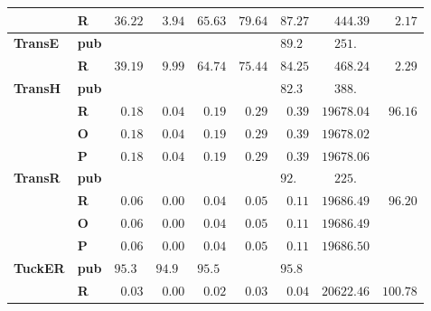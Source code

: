 \begin{tabular}{llrrrrrrr}
       & \textbf{R} &            $36.22$ &  $\phantom{0}3.94$ &            $65.63$ &            $79.64$ &            $87.27$ &            $\phantom{00}444.39$ &  $\phantom{00}2.17$ \\\midrule
\textbf{TransE} & \textbf{pub} &                    &                    &                    &                    &  $89.2\phantom{0}$ &  $\phantom{00}251.\phantom{00}$ &                     \\
       & \textbf{R} &            $39.19$ &  $\phantom{0}9.99$ &            $64.74$ &            $75.44$ &            $84.25$ &            $\phantom{00}468.24$ &  $\phantom{00}2.29$ \\\midrule
\textbf{TransH} & \textbf{pub} &                    &                    &                    &                    &  $82.3\phantom{0}$ &  $\phantom{00}388.\phantom{00}$ &                     \\
       & \textbf{R} &  $\phantom{0}0.18$ &  $\phantom{0}0.04$ &  $\phantom{0}0.19$ &  $\phantom{0}0.29$ &  $\phantom{0}0.39$ &                      $19678.04$ &  $\phantom{0}96.16$ \\
       & \textbf{O} &  $\phantom{0}0.18$ &  $\phantom{0}0.04$ &  $\phantom{0}0.19$ &  $\phantom{0}0.29$ &  $\phantom{0}0.39$ &                      $19678.02$ &                     \\
       & \textbf{P} &  $\phantom{0}0.18$ &  $\phantom{0}0.04$ &  $\phantom{0}0.19$ &  $\phantom{0}0.29$ &  $\phantom{0}0.39$ &                      $19678.06$ &                     \\\midrule
\textbf{TransR} & \textbf{pub} &                    &                    &                    &                    &  $92.\phantom{00}$ &  $\phantom{00}225.\phantom{00}$ &                     \\
       & \textbf{R} &  $\phantom{0}0.06$ &  $\phantom{0}0.00$ &  $\phantom{0}0.04$ &  $\phantom{0}0.05$ &  $\phantom{0}0.11$ &                      $19686.49$ &  $\phantom{0}96.20$ \\
       & \textbf{O} &  $\phantom{0}0.06$ &  $\phantom{0}0.00$ &  $\phantom{0}0.04$ &  $\phantom{0}0.05$ &  $\phantom{0}0.11$ &                      $19686.49$ &                     \\
       & \textbf{P} &  $\phantom{0}0.06$ &  $\phantom{0}0.00$ &  $\phantom{0}0.04$ &  $\phantom{0}0.05$ &  $\phantom{0}0.11$ &                      $19686.50$ &                     \\\midrule
\textbf{TuckER} & \textbf{pub} &  $95.3\phantom{0}$ &  $94.9\phantom{0}$ &  $95.5\phantom{0}$ &                    &  $95.8\phantom{0}$ &                                 &                     \\
       & \textbf{R} &  $\phantom{0}0.03$ &  $\phantom{0}0.00$ &  $\phantom{0}0.02$ &  $\phantom{0}0.03$ &  $\phantom{0}0.04$ &                      $20622.46$ &            $100.78$ \\
\bottomrule
\end{tabular}

